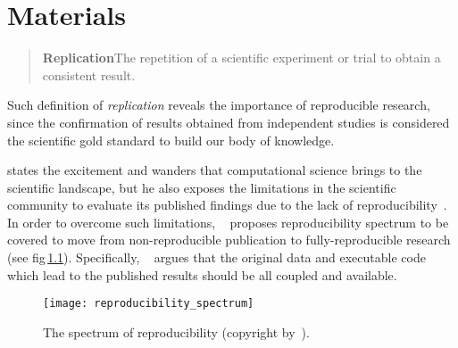 \acresetall
\graphicspath{{4_materials/figures/}}
\chapter{Materials}\label{chap:4}

\begin{quote}
  \textbf{Replication}\quad The repetition of a scientific
  experiment or trial to obtain a consistent result.
\end{quote}

\noindent Such definition of \emph{replication} reveals the importance of reproducible research, since the confirmation of results obtained from independent studies is considered the scientific gold standard to build our body of knowledge.

\citeauthor{peng2011reproducible} states the excitement and wanders that computational science brings to the scientific landscape, but he also exposes the limitations in the scientific community to evaluate its published findings due to the lack of reproducibility~\cite{peng2011reproducible}.
In order to overcome such limitations, \citeauthor{peng2011reproducible}~\cite{peng2011reproducible} proposes reproducibility spectrum to be covered to move from non-reproducible publication to fully-reproducible research (see \acs{fig}\,\ref{fig:reproducibility_spectrum}).
Specifically, \citeauthor{peng2011reproducible}~\cite{peng2011reproducible} argues that the original data and executable code which lead to the published results should be all coupled and available. 

\begin{figure}
\centering
\texttt{[image: reproducibility\_spectrum]}
\caption[The spectrum of reproducibility.]{The spectrum of reproducibility (copyright by~\cite{peng2011reproducible}).}
\label{fig:reproducibility_spectrum}
\end{figure}

